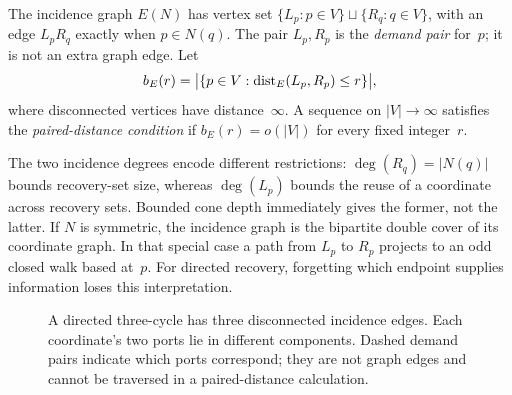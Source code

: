 \begin{definition}\label{def:pre-incidence}
The incidence graph $E(N)$ has vertex set $\{L_p:p\in V\}\sqcup\{R_q:q\in V\}$, with an edge $L_pR_q$ exactly when $p\in N(q)$. The pair $L_p,R_p$ is the \emph{demand pair} for~$p$; it is not an extra graph edge. Let
\[
 b_E(r)=\bigl|\{p\in V:\operatorname{dist}_E(L_p,R_p)\le r\}\bigr|,
\]
where disconnected vertices have distance~$\infty$. A sequence on $|V|\to\infty$ satisfies the \emph{paired-distance condition} if $b_E(r)=o(|V|)$ for every fixed integer~$r$.
\end{definition}

The two incidence degrees encode different restrictions: $\deg(R_q)=|N(q)|$ bounds recovery-set size, whereas $\deg(L_p)$ bounds the reuse of a coordinate across recovery sets. Bounded cone depth immediately gives the former, not the latter. If $N$ is symmetric, the incidence graph is the bipartite double cover of its coordinate graph. In that special case a path from $L_p$ to $R_p$ projects to an odd closed walk based at~$p$. For directed recovery, forgetting which endpoint supplies information loses this interpretation.

\begin{figure}[htbp]
\centering
{}
\caption{A directed three-cycle has three disconnected incidence edges.
Each coordinate's two ports lie in different components. Dashed demand
pairs indicate which ports correspond; they are not graph edges and
cannot be traversed in a paired-distance calculation.}
\label{fig:paired-ports}
\end{figure}

